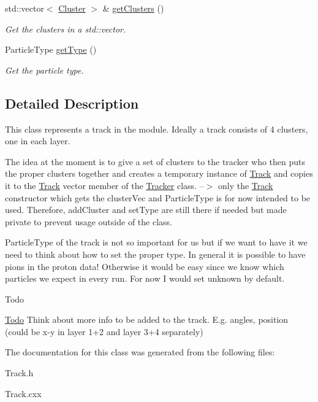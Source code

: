 \begin{DoxyCompactItemize}
\mbox{\label{classTrack_a0149ece9918ed90bc99006ae9c1cd8d7}} 
std\+::vector$<$ \hyperlink{classCluster}{Cluster} $>$ \& \hyperlink{classTrack_a0149ece9918ed90bc99006ae9c1cd8d7}{get\+Clusters} ()
\begin{DoxyCompactList}\small\item\em Get the clusters in a std\+::vector. \end{DoxyCompactList}\item 
\mbox{\label{classTrack_a3ae40902193e1d07034e3ee76a488a11}} 
Particle\+Type \hyperlink{classTrack_a3ae40902193e1d07034e3ee76a488a11}{get\+Type} ()
\begin{DoxyCompactList}\small\item\em Get the particle type. \end{DoxyCompactList}\end{DoxyCompactItemize}


\subsection{Detailed Description}
This class represents a track in the module. Ideally a track consists of 4 clusters, one in each layer.

The idea at the moment is to give a set of clusters to the tracker who then puts the proper clusters together and creates a temporary instance of \hyperlink{classTrack}{Track} and copies it to the \hyperlink{classTrack}{Track} vector member of the \hyperlink{classTracker}{Tracker} class. --$>$ only the \hyperlink{classTrack}{Track} constructor which gets the cluster\+Vec and Particle\+Type is for now intended to be used. Therefore, add\+Cluster and set\+Type are still there if needed but made private to prevent usage outside of the class.

Particle\+Type of the track is not so important for us but if we want to have it we need to think about how to set the proper type. In general it is possible to have pions in the proton data! Otherwise it would be easy since we know which particles we expect in every run. For now I would set unknown by default. \begin{DoxyRefDesc}{Todo}
\item[\hyperlink{todo__todo000002}{Todo}]Think about more info to be added to the track. E.\+g. angles, position (could be x-\/y in layer 1+2 and layer 3+4 separately) \end{DoxyRefDesc}


The documentation for this class was generated from the following files\+:\begin{DoxyCompactItemize}
\item 
Track.\+h\item 
Track.\+cxx\end{DoxyCompactItemize}
